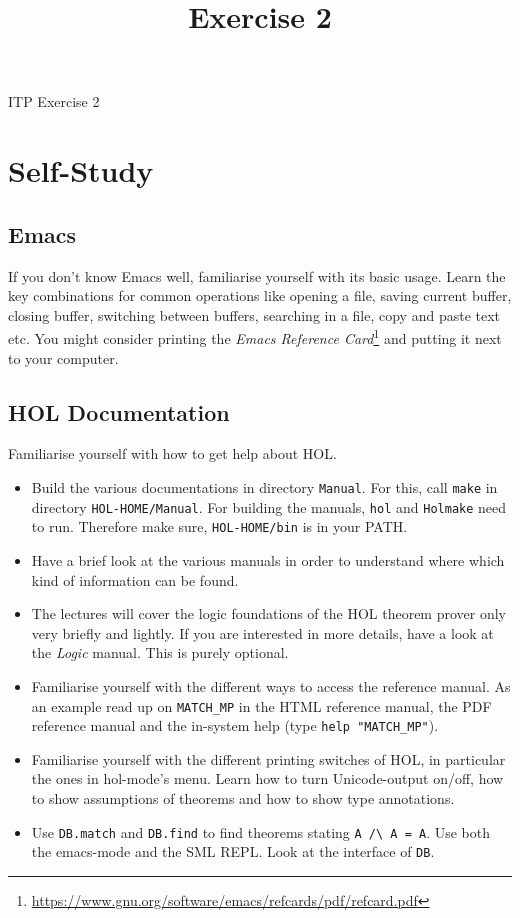 \documentclass[a4paper,10pt,oneside]{scrartcl}
\title{Exercise 2}
\begin{document}
\begin{center}
ITP Exercise 2
\end{center}
\bigskip


\section{Self-Study}

\subsection{Emacs}
If you don't know Emacs well, familiarise yourself with its basic usage. Learn the key combinations for common operations like
opening a file, saving current buffer, closing buffer, switching between buffers, searching in a file, copy and paste text etc.
You might consider printing the \emph{Emacs Reference Card}\footnote{\url{https://www.gnu.org/software/emacs/refcards/pdf/refcard.pdf}} and putting
it next to your computer.

\subsection{HOL Documentation}
Familiarise yourself with how to get help about HOL.

\begin{itemize}
\item Build the various documentations in directory \texttt{Manual}. For this, call \texttt{make} in directory \texttt{HOL-HOME/Manual}. For building the manuals, \texttt{hol} and \texttt{Holmake} need to run.
Therefore make sure, \texttt{HOL-HOME/bin} is in your PATH.
\item Have a brief look at the various manuals in order to understand where which kind of information
can be found.
\item The lectures will cover the logic foundations of the HOL
theorem prover only very briefly and lightly. If you are interested in more
details, have a look at the \emph{Logic} manual. This is purely optional.
\item Familiarise yourself with the different ways to access the reference manual.
  As an example read up on \texttt{MATCH\_MP} in the HTML reference manual, the PDF reference manual and the in-system help (type \texttt{help "MATCH\_MP"}).
\item Familiarise yourself with the different printing switches of HOL, in particular the ones in hol-mode's menu. Learn how to turn Unicode-output on/off, how to show assumptions of theorems and how to show type annotations. 
\item Use \texttt{DB.match} and \texttt{DB.find} to find theorems stating \verb#A /\ A = A#. Use both the emacs-mode and the SML REPL. Look at the interface of \texttt{DB}.
\end{itemize}
\end{document}
